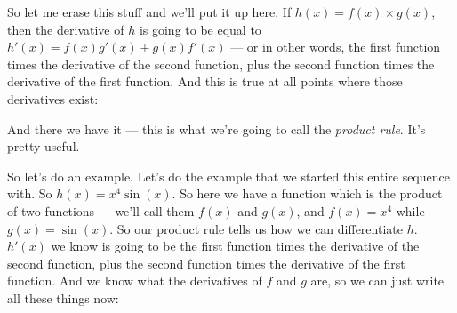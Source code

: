 \documentclass[pdftex, brazil, 12pt, twoside]{article}
\begin{document}
So let me erase this stuff and we'll put it up here.
If $h(x) = f(x) \times g(x)$, then
the derivative of $h$ is going to be equal to $h'(x) = f(x)g'(x) + g(x)f'(x)$
--- or in other words, the first function times
the derivative of the second function,
plus the second function times the derivative
of the first function.
And this is true at all points where those derivatives exist:

\begin{figure}[H]
  \begin{center}
  \end{center}
\end{figure}

And there we have it --- this is what
we're going to call the \emph{product rule}.
It's pretty useful.

So let's do an example.
Let's do the example that we started this entire sequence
with.
So $h(x) = x^4 \sin{(x)}$.
So here we have a function which is
the product of two functions --- we'll call them
$f(x)$ and $g(x)$, and $f(x) = x^4$ while
$g(x) = \sin{(x)}$.
So our product rule tells us how we can differentiate $h$.
$h'(x)$ we know is going to be
the first function times the derivative
of the second function, plus the second function
times the derivative of the first function.
And we know what the derivatives of $f$ and $g$ are,
so we can just write all these things now:

\begin{figure}[H]
  \begin{center}
  \end{center}
\end{figure}
\end{document}
